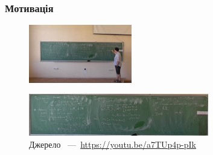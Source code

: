 \begin{frame}
    \frametitle{Мотивація}
    \begin{figure}
        \includegraphics[width=0.4\textwidth]{images/before.png}
    \end{figure}
    \begin{figure}
        \includegraphics[width=0.7\textwidth]{images/after.png}
        \caption{Джерело ~---~\url{https://youtu.be/a7TUp4p-pIk}
        }
    \end{figure}
\end{frame}
